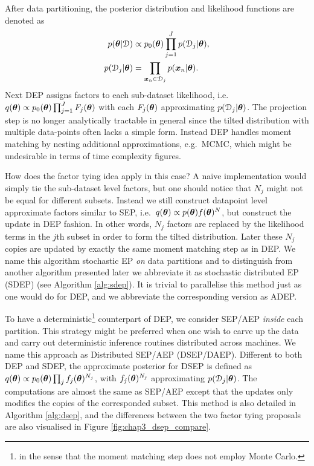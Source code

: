 
After data partitioning, the posterior distribution and likelihood functions are denoted as
\begin{align}
p(\bm{\theta}|\mathcal{D}) &\propto p_0(\bm{\theta}) \prod_{j=1}^J p(\mathcal{D}_j|\bm{\theta}), \\
p(\mathcal{D}_j|\bm{\theta}) &= \prod_{\bm{x}_n \in \mathcal{D}_j} p(\bm{x}_n | \bm{\theta}).
\end{align}
%
Next DEP assigns factors to each sub-dataset likelihood, i.e.~$q(\bm{\theta}) \propto p_0(\bm{\theta}) \prod_{j = 1}^J F_j(\bm{\theta})$ with each $F_j(\bm{\theta})$ approximating $p(\mathcal{D}_j|\bm{\theta})$. The projection step is no longer analytically tractable in general since the tilted distribution with multiple data-points often lacks a simple form. Instead DEP handles moment matching by nesting additional approximations, e.g.~MCMC, which might be undesirable in terms of time complexity figures.

How does the factor tying idea apply in this case? A naive implementation would simply tie the sub-dataset level factors, but one should notice that $N_j$ might not be equal for different subsets. Instead we still construct datapoint level approximate factors similar to SEP, i.e.~$q(\bm{\theta}) \propto p(\bm{\theta}) f(\bm{\theta})^N$, but construct the update in DEP fashion. In other words, $N_j$ factors are replaced by the likelihood terms in the $j$th subset in order to form the tilted distribution. Later these $N_j$ copies are updated by exactly the same moment matching step as in DEP. We name this algorithm stochastic EP \emph{on} data partitions and to distinguish from another algorithm presented later we abbreviate it as stochastic distributed EP (SDEP) (see Algorithm \ref{alg:sdep}). It is trivial to parallelise this method just as one would do for DEP, and we abbreviate the corresponding version as ADEP. 

%
To have a deterministic\footnote{in the sense that the moment matching step does not employ Monte Carlo.} counterpart of DEP, we consider SEP/AEP \emph{inside} each partition. This strategy might be preferred when one wish to carve up the data and carry out deterministic inference routines distributed across machines. We name this approach as Distributed SEP/AEP (DSEP/DAEP). Different to both DEP and SDEP, the approximate posterior for DSEP is defined as $q(\bm{\theta}) \propto p_0(\bm{\theta}) \prod_j f_j(\bm{\theta})^{N_j}$, with $f_j(\bm{\theta})^{N_j}$ approximating $p(\mathcal{D}_j|\bm{\theta})$. The computations are almost the same as SEP/AEP except that the updates only modifies the copies of the corresponded subset. This method is also detailed in Algorithm \ref{alg:dsep}, and the differences between the two factor tying proposals are also visualised in Figure \ref{fig:chap3_dsep_compare}.

